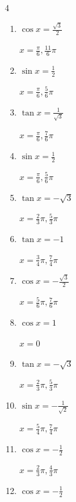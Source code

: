 \begin{multicols}{4}
\begin{enumerate}
  \item $\displaystyle \cos{x}  = \frac{\sqrt{3}}{2}$

        $\displaystyle x = \frac{\pi}{6} , \frac{11}{6}\pi$

  \item $\displaystyle \sin{x}  = \frac{1}{2}$

        $\displaystyle x = \frac{\pi}{6} , \frac{5}{6}\pi$

  \item $\displaystyle \tan{x}  = \frac{1}{\sqrt{3}}$

        $\displaystyle x = \frac{\pi}{6} , \frac{7}{6}\pi$

\columnbreak %

  \item $\displaystyle \sin{x}  = \frac{1}{2}$

        $\displaystyle x = \frac{\pi}{6} , \frac{5}{6}\pi$

  \item $\displaystyle \tan{x}  = -\sqrt{3}$

        $\displaystyle x = \frac{2}{3}\pi , \frac{5}{3}\pi$

  \item $\displaystyle \tan{x}  = -1$

        $\displaystyle x = \frac{3}{4}\pi , \frac{7}{4}\pi$

  \item $\displaystyle \cos{x}  = -\frac{\sqrt{3}}{2}$

        $\displaystyle x = \frac{5}{6}\pi , \frac{7}{6}\pi$

  \item $\displaystyle \cos{x}  = 1$

        $\displaystyle x = 0$

  \item $\displaystyle \tan{x}  = -\sqrt{3}$

        $\displaystyle x = \frac{2}{3}\pi , \frac{5}{3}\pi$

  \item $\displaystyle \sin{x}  = -\frac{1}{\sqrt{2}}$

        $\displaystyle x = \frac{5}{4}\pi , \frac{7}{4}\pi$

  \item $\displaystyle \cos{x}  = -\frac{1}{2}$

        $\displaystyle x = \frac{2}{3}\pi , \frac{4}{3}\pi$

  \item $\displaystyle \cos{x}  = -\frac{1}{2}$


\end{enumerate}
\end{multicols}
